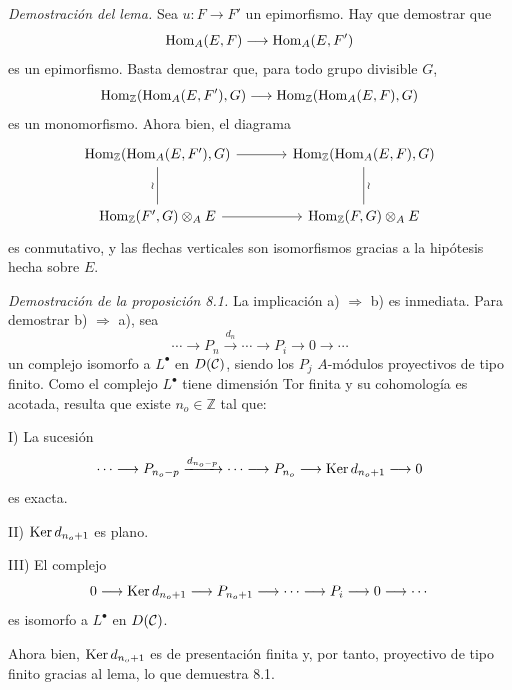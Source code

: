 \emph{Demostración del lema.} Sea $u:F\to F'$ un epimorfismo. Hay que demostrar que
\[
\operatorname{Hom}_A(E,F)\longrightarrow\operatorname{Hom}_A(E,F')
\]
es un epimorfismo. Basta demostrar que, para todo grupo divisible $G$,
\[
\operatorname{Hom}_{\mathbb Z}(\operatorname{Hom}_A(E,F'),G)\longrightarrow
\operatorname{Hom}_{\mathbb Z}(\operatorname{Hom}_A(E,F),G)
\]
es un monomorfismo. Ahora bien, el diagrama
\[
\begin{tikzcd}[column sep=large,row sep=large]
\Hom_{\mathbb Z}(\Hom_A(E,F'),G)
 \arrow[r]\arrow[d,dash,"\wr"']&
\Hom_{\mathbb Z}(\Hom_A(E,F),G)\arrow[d,dash,"\wr"]\\
\Hom_{\mathbb Z}(F',G)\otimes_A E
 \arrow[r]&
\Hom_{\mathbb Z}(F,G)\otimes_A E
\end{tikzcd}
\]
es conmutativo, y las flechas verticales son isomorfismos gracias a la hipótesis hecha sobre $E$.

\emph{Demostración de la proposición 8.1.} La implicación a) $\Rightarrow$ b) es inmediata. Para demostrar b) $\Rightarrow$ a), sea
\[
\cdots\longrightarrow P_n\xrightarrow{d_n}\cdots\longrightarrow P_i\longrightarrow 0\longrightarrow\cdots
\]
un complejo isomorfo a $L^\bullet$ en $D(\mathcal C)$, siendo los $P_j$ $A$-módulos proyectivos de tipo finito. Como el complejo $L^\bullet$ tiene dimensión Tor finita y su cohomología es acotada, resulta que existe $n_o\in\mathbb Z$ tal que:

I) La sucesión
\[
\cdots\longrightarrow P_{n_o-p}\xrightarrow{d_{n_o-p}}\cdots\longrightarrow
P_{n_o}\longrightarrow \operatorname{Ker} d_{n_o+1}\longrightarrow0
\]
es exacta.

II) $\operatorname{Ker} d_{n_o+1}$ es plano.

III) El complejo
\[
0\longrightarrow \operatorname{Ker} d_{n_o+1}\longrightarrow P_{n_o+1}\longrightarrow\cdots\longrightarrow P_i\longrightarrow0\longrightarrow\cdots
\]
es isomorfo a $L^\bullet$ en $D(\mathcal C)$.

Ahora bien, $\operatorname{Ker} d_{n_o+1}$ es de presentación finita y, por tanto, proyectivo de tipo finito gracias al lema, lo que demuestra 8.1.
